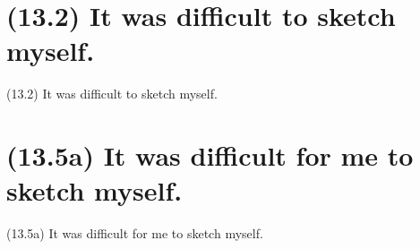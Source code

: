\documentclass{article}
\begin{document}
\clearpage

%
%

\section*{(13.2) It was difficult to sketch myself.}

\bigbreak
\begin{enumerate*}
\item[(13.2)] It was difficult to sketch myself.
\end{enumerate*}
\bigbreak

\bigbreak
\begin{minipage}{\textwidth}
\end{minipage}
\bigbreak

\clearpage

%
%

\section*{(13.5a) It was difficult for me to sketch myself.}

\bigbreak
\begin{enumerate*}
\item[(13.5a)] It was difficult for me to sketch myself.
\end{enumerate*}
\bigbreak

\bigbreak
\begin{minipage}{\textwidth}
\end{minipage}
\bigbreak
\end{document}
